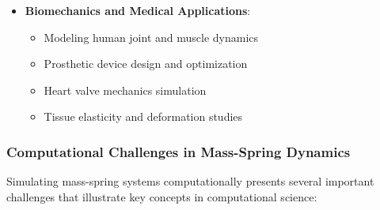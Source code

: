 \begin{itemize}
    \item \textbf{Biomechanics and Medical Applications}:
    \begin{itemize}
        \item Modeling human joint and muscle dynamics
        \item Prosthetic device design and optimization
        \item Heart valve mechanics simulation
        \item Tissue elasticity and deformation studies
    \end{itemize}
\end{itemize}

\subsubsection{Computational Challenges in Mass-Spring Dynamics}

Simulating mass-spring systems computationally presents several important challenges that illustrate key concepts in computational science:


